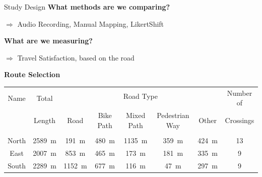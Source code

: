 \documentclass[
    english,
    accentcolor=9c,
    design=2023,
    logofile=images/hulogo.pdf,
]{tudabeamer}
\begin{document}
\begin{frame}{Study Design}
    \textbf{What methods are we comparing?}
    \pause

    \quad $\Rightarrow$ \;Audio Recording, Manual Mapping, LikertShift
    \pause

    \vspace*{1em}
    \textbf{What are we measuring?}
    \pause

    \quad $\Rightarrow$ \;Travel Satisfaction, based on the road
    \pause

    \vspace*{1em}
    \textbf{Route Selection}

    \vspace*{1em}
    \footnotesize
    \centering
    \begin{tabular}{c|c|ccccc|c}
        \multirow{2}{*}{Name} & \multirow{2}{2.4em}{Total\newline} & \multicolumn{5}{c|}{Road Type} & \multirow{2}{4.7em}{Number of\newline}\\
        \cline{3-7}
        &&&&&&&\\[-1em]
        & Length & Road & Bike Path & Mixed Path & Pedestrian Way & Other & Crossings\\[0.15em]
        \hline
        &&&&&&&\\[-0.8em]
        North & \SI{2589}{m} &  \SI{191}{m} & \SI{480}{m} & \SI{1135}{m} & \SI{359}{m} & \SI{424}{m} & 13\\[0.3em]
        East  & \SI{2007}{m} &  \SI{853}{m} & \SI{465}{m} &  \SI{173}{m} & \SI{181}{m} & \SI{335}{m} & 9\\[0.3em]
        South & \SI{2289}{m} & \SI{1152}{m} & \SI{677}{m} &  \SI{116}{m} &  \SI{47}{m} & \SI{297}{m} & 9\\
    \end{tabular}
\end{frame}
\end{document}
